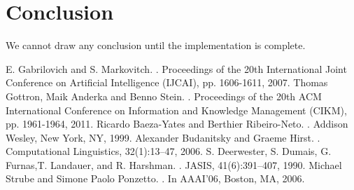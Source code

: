 \documentclass[journal,transmag]{IEEEtran}
\begin{document}
\section{\textbf{Conclusion}}
We cannot draw any conclusion until the implementation is complete.

\newpage

\begin{thebibliography}{1}
E. Gabrilovich and S. Markovitch.
.
\newblock Proceedings of the 20th International Joint Conference on Artificial Intelligence (IJCAI), pp. 1606-1611, 2007.
Thomas Gottron, Maik Anderka and Benno Stein.
.
\newblock Proceedings of the 20th ACM International Conference on Information and Knowledge Management (CIKM), pp. 1961-1964, 2011.
Ricardo Baeza-Yates and Berthier Ribeiro-Neto.
.
\newblock Addison Wesley, New York, NY, 1999.
Alexander Budanitsky and Graeme Hirst.
.
\newblock Computational Linguistics, 32(1):13–47, 2006.
S. Deerwester, S. Dumais, G. Furnas,T. Landauer, and R. Harshman.
.
\newblock JASIS, 41(6):391–407, 1990.
Michael Strube and Simone Paolo Ponzetto.
.
\newblock In AAAI’06, Boston, MA, 2006.
\end{thebibliography}
\end{document}
